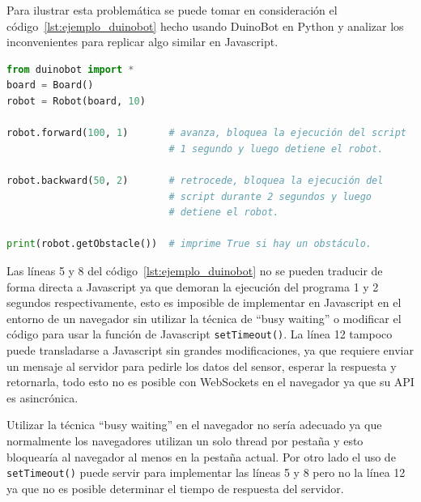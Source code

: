 Para ilustrar esta problemática se puede tomar en consideración el
código~\ref{lst:ejemplo_duinobot}
hecho usando DuinoBot en Python y analizar los inconvenientes para replicar
algo similar en Javascript.

\begin{lstlisting}[language=Python,
caption={Ejemplo típico usando DuinoBot},label=lst:ejemplo_duinobot]
from duinobot import *
board = Board()
robot = Robot(board, 10)

robot.forward(100, 1)       # avanza, bloquea la ejecución del script
                            # 1 segundo y luego detiene el robot.

robot.backward(50, 2)       # retrocede, bloquea la ejecución del
                            # script durante 2 segundos y luego
                            # detiene el robot.

print(robot.getObstacle())  # imprime True si hay un obstáculo.
\end{lstlisting}


Las líneas 5 y 8 del código~\ref{lst:ejemplo_duinobot}
no se pueden traducir de forma directa
a Javascript ya que demoran la ejecución del programa
1 y 2 segundos respectivamente, esto es imposible de implementar en
Javascript en el entorno de un navegador sin utilizar la técnica de ``busy
waiting'' o modificar el código para usar la función de Javascript
\texttt{setTimeout()}. La línea 12 tampoco puede transladarse a Javascript
sin grandes modificaciones, ya que requiere enviar un mensaje al servidor
para pedirle los datos del sensor, esperar la respuesta y retornarla, todo
esto no es posible con WebSockets en el navegador ya que su API es asincrónica.

Utilizar la técnica ``busy waiting'' en el navegador no sería adecuado ya que
normalmente los navegadores utilizan un solo thread por pestaña y esto
bloquearía al navegador al menos en la pestaña actual. Por otro lado
el uso de \texttt{setTimeout()} puede servir para implementar las líneas
5 y 8 pero no la línea 12 ya que no es posible determinar el tiempo
de respuesta del servidor.

